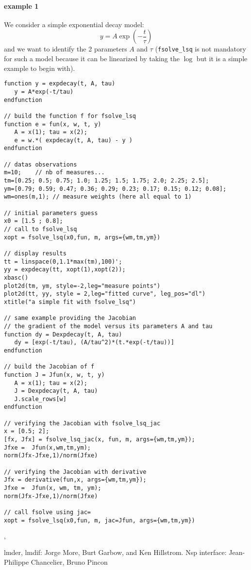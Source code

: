 \begin{examples}
\paragraph{example 1} 
We consider a simple exponential decay model:
$$
 y = A \exp(-\frac{t}{\tau})
$$
and we want to identify the 2 parameters $A$ and $\tau$ (\verb+fsolve_lsq+ is not
mandatory for such a model because it can be linearized by taking the $\log$ but
it is a simple example to begin with). 

\begin{Verbatim}
function y = expdecay(t, A, tau)
   y = A*exp(-t/tau) 
endfunction

// build the function f for fsolve_lsq
function e = fun(x, w, t, y)
   A = x(1); tau = x(2);
   e = w.*( expdecay(t, A, tau) - y )
endfunction

// datas observations
m=10;    // nb of measures...
tm=[0.25; 0.5; 0.75; 1.0; 1.25; 1.5; 1.75; 2.0; 2.25; 2.5];
ym=[0.79; 0.59; 0.47; 0.36; 0.29; 0.23; 0.17; 0.15; 0.12; 0.08];
wm=ones(m,1); // measure weights (here all equal to 1)

// initial parameters guess
x0 = [1.5 ; 0.8];
// call to fsolve_lsq
xopt = fsolve_lsq(x0,fun, m, args={wm,tm,ym})

// display results
tt = linspace(0,1.1*max(tm),100)';
yy = expdecay(tt, xopt(1),xopt(2));
xbasc()
plot2d(tm, ym, style=-2,leg="measure points")
plot2d(tt, yy, style = 2,leg="fitted curve", leg_pos="dl")
xtitle("a simple fit with fsolve_lsq")

// same example providing the Jacobian
// the gradient of the model versus its parameters A and tau
function dy = Dexpdecay(t, A, tau)
   dy = [exp(-t/tau), (A/tau^2)*(t.*exp(-t/tau))]
endfunction

// build the Jacobian of f
function J = Jfun(x, w, t, y)
   A = x(1); tau = x(2);
   J = Dexpdecay(t, A, tau)
   J.scale_rows[w]
endfunction

// verifying the Jacobian with fsolve_lsq_jac
x = [0.5; 2]; 
[fx, Jfx] = fsolve_lsq_jac(x, fun, m, args={wm,tm,ym});
Jfxe =  Jfun(x,wm,tm,ym);
norm(Jfx-Jfxe,1)/norm(Jfxe)

// verifying the Jacobian with derivative
Jfx = derivative(fun,x, args={wm,tm,ym});
Jfxe =  Jfun(x, wm, tm, ym);
norm(Jfx-Jfxe,1)/norm(Jfxe)

// call fsolve using jac=
xopt = fsolve_lsq(x0,fun, m, jac=Jfun, args={wm,tm,ym})
\end{Verbatim}

\end{examples}

\begin{manseealso}
  , 
\end{manseealso}

\begin{authors}
 lmder, lmdif: Jorge More, Burt Garbow, and Ken Hillstrom. Nsp interface: Jean-Philippe Chancelier, Bruno Pincon
\end{authors}
